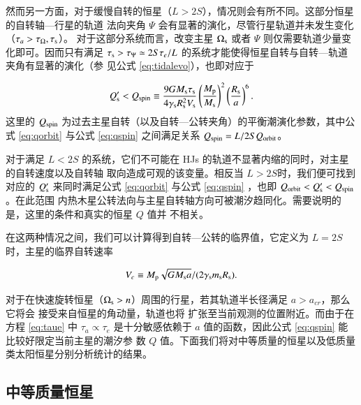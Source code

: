 然而另一方面，对于缓慢自转的恒星（$L>2S$），情况则会有所不同。这部分恒星的自转轴---行星的轨道
法向夹角 $\Psi$ 会有显著的演化，尽管行星轨道并未发生变化（$\tau_a >\tau_{\Omega},\tau_{\mathrm{s}}$）。
对于这部分系统而言，改变主星 $\Omega_\mathrm{s}$ 或者 $\Psi$ 则仅需要轨道少量变化即可。因而只有满足
$\tau_\mathrm{s}>\tau_\Psi \simeq 2S \tau_e/L$ 的系统才能使得恒星自转与自转---轨道夹角有显著的演化（参
见公式 \ref{eq:tidalevo}），也即对应于

\begin{equation}  \label{eq:qspin}
Q_\mathrm{s}^\prime < Q_{\rm spin} \equiv {9 G M_\mathrm{s} \tau_\mathrm{s} 
\over 4 \gamma_\mathrm{s} R_\mathrm{s}^2 V_\mathrm{s}} 
\left( {M_\mathrm{p} \over M_\mathrm{s}} \right)^2 
\left({R_\mathrm{s} \over a} \right)^{6}.
\end{equation} %
这里的 $Q_{\rm spin} $ 为过去主星自转（以及自转---公转夹角）的平衡潮演化参数，其中公式 \ref{eq:qorbit} 
与公式 \ref{eq:qspin} 之间满足关系 $Q_{\rm spin} = L/2S Q_{\rm orbit}$。

对于满足 $L< 2S$ 的系统，它们不可能在 HJs 的轨道不显著内缩的同时，对主星的自转速度以及自转轴
取向造成可观的该变量。相反当 $L>2S$时，我们便可找到对应的 $Q_\mathrm{s}^\prime $ 来同时满足公式 
\ref{eq:qorbit} 与公式 \ref{eq:qspin} ，也即 $Q_{\rm orbit} < Q_\mathrm{s}^\prime < Q_{\rm spin}$。在此范围
内热木星公转法向与主星自转轴方向可被潮汐趋同化。需要说明的是，这里的条件和真实的恒星 $Q$ 值并
不相关。

在这两种情况之间，我们可以计算得到自转---公转的临界值，它定义为 $L=2S $时，主星的临界自转速率

\begin{equation} \label{eq:vc}
V_c \equiv {M_\mathrm{p} {\sqrt{G M_\mathrm{s} a}} /( 2 \gamma_\mathrm{s} m_\mathrm{s}R_\mathrm{s}}).
\end{equation} %

对于在快速旋转恒星（$\Omega_\mathrm{s} > n$）周围的行星，若其轨道半长径满足 $a > a_{cr}$，那么它将会
接受来自恒星的角动量，轨道也将	扩张至当前观测的位置附近。而由于在方程 \ref{eq:taue} 中 $\tau_a 
\propto \tau_e$ 是十分敏感依赖于 $a$ 值的函数，因此公式 \ref{eq:qspin} 能比较好限定当前主星的潮汐参
数 $Q$ 值。下面我们将对中等质量的恒星以及低质量类太阳恒星分别分析统计的结果。

\subsection{中等质量恒星} \label{sec:hotstar}

